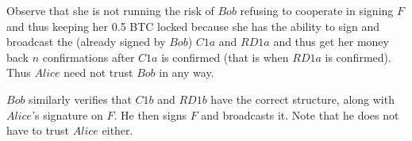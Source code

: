 \begin{enumerate}
    Observe that she is not running the risk of $Bob$ refusing to cooperate in signing $F$
    and thus keeping her 0.5 BTC locked because she has the ability to sign and broadcast
    the (already signed by $Bob$) $C1a$ and $RD1a$ and thus get her money back $n$
    confirmations after $C1a$ is confirmed (that is when $RD1a$ is confirmed). Thus
    $Alice$ need not trust $Bob$ in any way.

    $Bob$ similarly verifies that $C1b$ and $RD1b$ have the correct structure, along with
    $Alice$'s signature on $F$. He then signs $F$ and broadcasts it. Note that he does not
    have to trust $Alice$ either.
  \end{enumerate}
